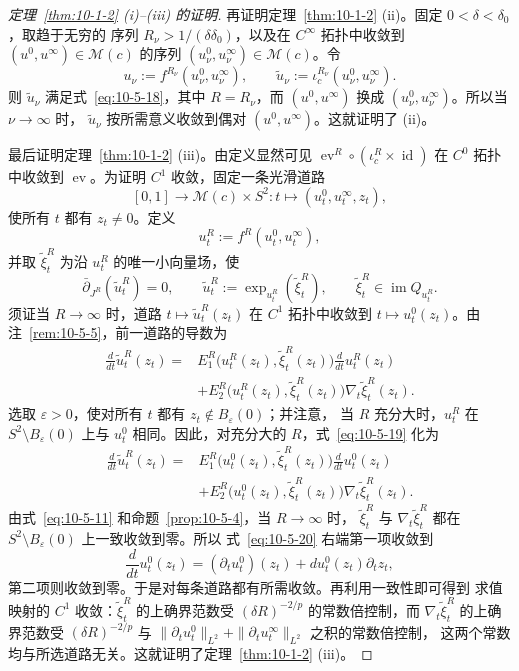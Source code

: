 \begin{proof}[定理~\ref{thm:10-1-2} (i)--(iii) 的证明]
再证明定理~\ref{thm:10-1-2} (ii)。固定 $0<\delta<\delta_0$，取趋于无穷的
序列 $R_\nu>1/(\delta\delta_0)$，以及在 $C^\infty$ 拓扑中收敛到
$(u^0,u^\infty)\in\mathcal M(c)$ 的序列
$(u_\nu^0,u_\nu^\infty)\in\mathcal M(c)$。令
\[
  u_\nu:=f^{R_\nu}(u_\nu^0,u_\nu^\infty),
  \qquad
  \widetilde u_\nu:=\iota_c^{R_\nu}(u_\nu^0,u_\nu^\infty).
\]
则 $\widetilde u_\nu$ 满足式~\eqref{eq:10-5-18}，其中
$R=R_\nu$，而 $(u^0,u^\infty)$ 换成
$(u_\nu^0,u_\nu^\infty)$。所以当 $\nu\to\infty$ 时，
$\widetilde u_\nu$ 按所需意义收敛到偶对 $(u^0,u^\infty)$。这就证明了 (ii)。

最后证明定理~\ref{thm:10-1-2} (iii)。由定义显然可见
$\operatorname{ev}^R\circ(\iota_c^R\times\operatorname{id})$ 在
$C^0$ 拓扑中收敛到 $\operatorname{ev}$。为证明 $C^1$ 收敛，固定一条光滑道路
\[
  [0,1]\longrightarrow\mathcal M(c)\times S^2:
  t\longmapsto(u_t^0,u_t^\infty,z_t),
\]
使所有 $t$ 都有 $z_t\ne0$。定义
\[
  u_t^R:=f^R(u_t^0,u_t^\infty),
\]
并取 $\widetilde\xi_t^R$ 为沿 $u_t^R$ 的唯一小向量场，使
\[
  \bar\partial_{J^R}(\widetilde u_t^R)=0,
  \qquad
  \widetilde u_t^R:=\exp_{u_t^R}(\widetilde\xi_t^R),
  \qquad
  \widetilde\xi_t^R\in\operatorname{im}Q_{u_t^R}.
\]
须证当 $R\to\infty$ 时，道路
$t\mapsto\widetilde u_t^R(z_t)$ 在 $C^1$ 拓扑中收敛到
$t\mapsto u_t^0(z_t)$。由注~\ref{rem:10-5-5}，前一道路的导数为
\begin{equation}\label{eq:10-5-19}
\begin{aligned}
  \frac{d}{dt}\widetilde u_t^R(z_t)
  ={}&E_1^R\bigl(u_t^R(z_t),\widetilde\xi_t^R(z_t)\bigr)
      \frac{d}{dt}u_t^R(z_t)\\
  &+E_2^R\bigl(u_t^R(z_t),\widetilde\xi_t^R(z_t)\bigr)
      \nabla_t\widetilde\xi_t^R(z_t).
\end{aligned}
\end{equation}
选取 $\varepsilon>0$，使对所有 $t$ 都有 $z_t\notin B_\varepsilon(0)$；并注意，
当 $R$ 充分大时，$u_t^R$ 在 $S^2\setminus B_\varepsilon(0)$ 上与
$u_t^0$ 相同。因此，对充分大的 $R$，式~\eqref{eq:10-5-19} 化为
\begin{equation}\label{eq:10-5-20}
\begin{aligned}
  \frac{d}{dt}\widetilde u_t^R(z_t)
  ={}&E_1^R\bigl(u_t^0(z_t),\widetilde\xi_t^R(z_t)\bigr)
      \frac{d}{dt}u_t^0(z_t)\\
  &+E_2^R\bigl(u_t^0(z_t),\widetilde\xi_t^R(z_t)\bigr)
      \nabla_t\widetilde\xi_t^R(z_t).
\end{aligned}
\end{equation}
由式~\eqref{eq:10-5-11} 和命题~\ref{prop:10-5-4}，当 $R\to\infty$ 时，
$\widetilde\xi_t^R$ 与 $\nabla_t\widetilde\xi_t^R$ 都在
$S^2\setminus B_\varepsilon(0)$ 上一致收敛到零。所以
式~\eqref{eq:10-5-20} 右端第一项收敛到
\[
  \frac{d}{dt}u_t^0(z_t)
  =(\partial_tu_t^0)(z_t)+du_t^0(z_t)\partial_tz_t,
\]
第二项则收敛到零。于是对每条道路都有所需收敛。再利用一致性即可得到
求值映射的 $C^1$ 收敛：$\widetilde\xi_t^R$ 的上确界范数受
$(\delta R)^{-2/p}$ 的常数倍控制，而
$\nabla_t\widetilde\xi_t^R$ 的上确界范数受
$(\delta R)^{-2/p}$ 与
$\|\partial_tu_t^0\|_{L^2}+\|\partial_tu_t^\infty\|_{L^2}$ 之积的常数倍控制，
这两个常数均与所选道路无关。这就证明了定理~\ref{thm:10-1-2} (iii)。
\end{proof}

